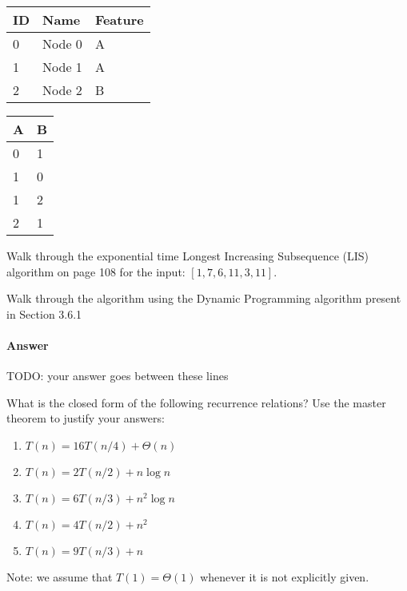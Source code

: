 \documentclass{article}
\begin{document}
\begin{enumerate}
	\begin{table}[H]
		\begin{tabular}{|l|l|l|}
			\hline
			ID & Name   & Feature \\ \hline
			0  & Node 0 & A       \\ \hline
			1  & Node 1 & A       \\ \hline
			2  & Node 2 & B       \\ \hline
		\end{tabular}
	\end{table}
	\begin{table}[H]
		\begin{tabular}{|l|l|}
			\hline
			A & B \\ \hline
			0 & 1 \\ \hline
			1 & 0 \\ \hline
			1 & 2 \\ \hline
			2 & 1 \\ \hline
		\end{tabular}
	\end{table}
\end{enumerate}



\nextprob
{}

Walk through the exponential time Longest Increasing Subsequence (LIS) algorithm
on page 108 for the input: $\left[ 1, 7, 6, 11, 3, 11 \right]$.

Walk through the algorithm using the Dynamic Programming algorithm present in
Section 3.6.1

\paragraph{Answer}


TODO: your answer goes between these lines


\nextprob
{}

What is the closed form of the following recurrence relations?  Use the master
theorem to justify your answers:
\begin{enumerate}
    \item $T(n) = 16 T(n/4) + \Theta(n)$
    \item $T(n) = 2 T(n/2) + n \log{n}$
    \item $T(n) = 6 T(n/3) + n^2 \log{n}$
    \item $T(n) = 4 T(n/2) + n^2$
    \item $T(n) = 9 T(n/3) + n$
\end{enumerate}
Note: we assume that $T(1)=\Theta(1)$ whenever it is not explicitly given.
\end{document}
